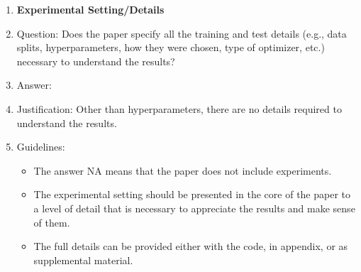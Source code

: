 \documentclass{article}
\begin{document}
\begin{enumerate}
\item {\bf Experimental Setting/Details}
    \item[] Question: Does the paper specify all the training and test details (e.g., data splits, hyperparameters, how they were chosen, type of optimizer, etc.) necessary to understand the results?
    \item[] Answer: \answerYes{} %
    \item[] Justification: Other than hyperparameters, there are no details required to understand the results.
    \item[] Guidelines:
    \begin{itemize}
        \item The answer NA means that the paper does not include experiments.
        \item The experimental setting should be presented in the core of the paper to a level of detail that is necessary to appreciate the results and make sense of them.
        \item The full details can be provided either with the code, in appendix, or as supplemental material.
    \end{itemize}


\end{enumerate}
\end{document}
